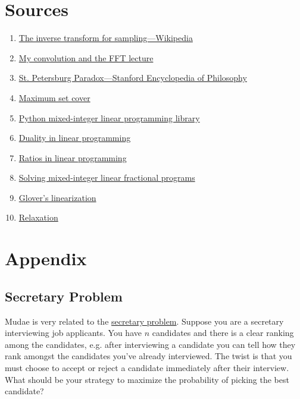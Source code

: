 \documentclass[11pt, oneside]{article}
\theoremstyle{plain}
\theoremstyle{definition}
\begin{document}
\section{Sources}
\begin{enumerate}
  \item \href{https://en.wikipedia.org/wiki/Inverse_transform_sampling}
    {The inverse transform for sampling---Wikipedia}
  \item \href{https://activities.tjhsst.edu/sct/lectures/2021/2020_10_23_FFT_handout.pdf}
    {My convolution and the FFT lecture}
  \item \href{https://plato.stanford.edu/entries/paradox-stpetersburg/}
    {St. Petersburg Paradox---Stanford Encyclopedia of Philosophy}
  \item \href{https://people.seas.harvard.edu/~yaron/AM221-S16/lecture_notes/AM221_lecture18.pdf}
    {Maximum set cover}
  \item \href{https://www.python-mip.com/}
    {Python mixed-integer linear programming library}
  \item \href{http://web.mit.edu/15.053/www/AMP-Chapter-04.pdf}
    {Duality in linear programming}
  \item \href{http://lpsolve.sourceforge.net/5.1/ratio.htm}
    {Ratios in linear programming}
  \item \href{https://optimization.mccormick.northwestern.edu/index.php/Mixed-integer_linear_fractional_programming_(MILFP)}
    {Solving mixed-integer linear fractional programs}
  \item \href{https://doi.org/10.1016/j.disopt.2004.03.006}
    {Glover's linearization}
  \item \href{https://glossary.informs.org/ver2/mpgwiki/index.php?title=Relaxation} 
    {Relaxation}
\end{enumerate}

\newpage

\section{Appendix}
\subsection{Secretary Problem} \label{subsec:secretary}
Mudae is very related to the
\href{https://www.smbc-comics.com/comic/percent}{secretary problem}. Suppose
you are a secretary interviewing job applicants. You have \( n \) candidates
and there is a clear ranking among the candidates, e.g. after interviewing
a candidate you can tell how they rank amongst the candidates you've
already interviewed. The twist is that you must choose to accept or reject
a candidate immediately after their interview. What should be your strategy
to maximize the probability of picking the best candidate?
\end{document}
